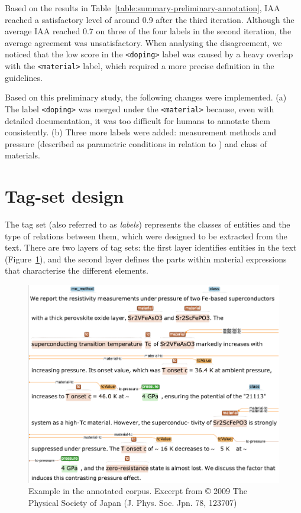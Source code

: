 Based on the results in Table~\ref{table:summary-preliminary-annotation}, IAA reached a satisfactory level of around 0.9 after the third iteration. 
Although the average IAA reached 0.7 on three of the four labels in the second iteration, the average agreement was unsatisfactory. 
When analysing the disagreement, we noticed that the low score in the \texttt{<doping>} label was caused by a heavy overlap with the \texttt{<material>} label, which required a more precise definition in the guidelines. 

Based on this preliminary study, the following changes were implemented. 
(a) The label \texttt{<doping>} was merged under the \texttt{<material>} because, even with detailed documentation, it was too difficult for humans to annotate them consistently.
(b) Three more labels were added: measurement methods and pressure (described as parametric conditions in relation to \tc) and class of materials. 

\section{Tag-set design}
The tag set (also referred to as \textit{labels}) represents the classes of entities and the type of relations between them, which were designed to be extracted from the text. There are two layers of tag sets: the first layer identifies entities in the text (Figure~\ref{fig:example-annotations-and-links}), and the second layer defines the parts within material expressions that characterise the different elements.

\begin{figure}[htbp]
  \centering
  \includegraphics[width=\linewidth]{figures/supermat/Fig1.png}
  \caption{Example in the annotated corpus. Excerpt from © 2009 The Physical Society of Japan (J. Phys. Soc. Jpn. 78, 123707)}
  \label{fig:example-annotations-and-links}
\end{figure}


